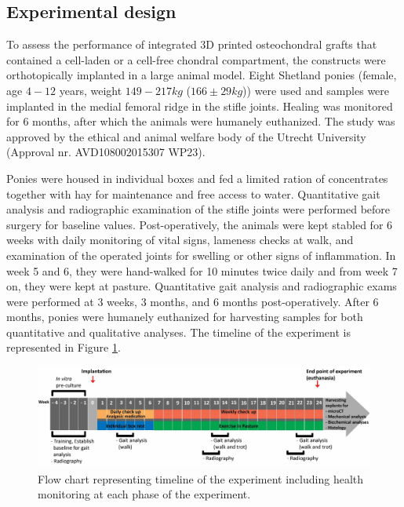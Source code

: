 \documentclass[twocolumn, serif, empirical, authordate, seplic]{jote-article}
\begin{document}
 {}\subsection*{Experimental design} 

To assess the performance of integrated 3D printed osteochondral grafts that contained a cell-laden or a cell-free chondral compartment, the constructs were orthotopically implanted in a large animal model. Eight Shetland ponies (female, age $4-12$ years, weight $149 - 217 kg$ ($166 \pm 29 kg$)) were used and samples were implanted in the medial femoral ridge in the stifle joints. Healing was monitored for 6 months, after which the animals were humanely euthanized. The study was approved by the ethical and animal welfare body of the Utrecht University (Approval nr. AVD108002015307 WP23).

Ponies were housed in individual boxes and fed a limited ration of concentrates together with hay for maintenance and free access to water. Quantitative gait analysis and radiographic examination of the stifle joints were performed before surgery for baseline values. Post-operatively, the animals were kept stabled for 6 weeks with daily monitoring of vital signs, lameness checks at walk, and examination of the operated joints for swelling or other signs of inflammation. In week 5 and 6, they were hand-walked for 10 minutes twice daily and from week 7 on, they were kept at pasture. Quantitative gait analysis and radiographic exams were performed at 3 weeks, 3 months, and 6 months post-operatively. After 6 months, ponies were humanely euthanized for harvesting samples for both quantitative and qualitative analyses. The timeline of the experiment is represented in Figure \ref{fig:figure1}.

\begin{figure}
\centering \includegraphics[width=.8\textwidth]{articles/empirical/horse/media/image1.jpg}
\caption{Flow chart representing timeline of the experiment including health monitoring at each phase of the experiment.}
\label{fig:figure1}\end{figure}
\end{document}
